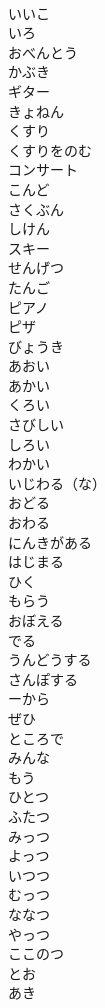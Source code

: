 \documentclass[8pt]{extreport}
\begin{document}
\begin{CJK}{UTF8}{min}
\\	いいこ	
\\	いろ	
\\	おべんとう	
\\	かぶき	
\\	ギター	
\\	きょねん	
\\	くすり	
\\	くすりをのむ	
\\	コンサート	
\\	こんど	
\\	さくぶん	
\\	しけん	
\\	スキー	
\\	せんげつ	
\\	たんご	
\\	ピアノ	
\\	ピザ	
\\	びょうき	
\\	あおい	
\\	あかい	
\\	くろい	
\\	さびしい	
\\	しろい	
\\	わかい	
\\	いじわる（な）	
\\	おどる	
\\	おわる	
\\	にんきがある	
\\	はじまる	
\\	ひく	
\\	もらう	
\\	おぼえる	
\\	でる	
\\	うんどうする	
\\	さんぽする	
\\	ーから	
\\	ぜひ	
\\	ところで	
\\	みんな	
\\	もう	
\\	ひとつ	
\\	ふたつ	
\\	みっつ	
\\	よっつ	
\\	いつつ	
\\	むっつ	
\\	ななつ	
\\	やっつ	
\\	ここのつ	
\\	とお	
\\	あき	

\end{CJK}
\end{document}
